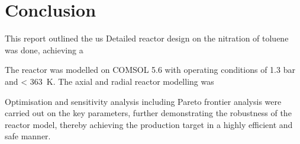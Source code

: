 \section{Conclusion} \label{sec:conclusion}
This report outlined the us
Detailed reactor design on the nitration of toluene was done, achieving a 

The reactor was modelled on COMSOL 5.6 with operating conditions of 1.3 bar and \SI{< 363}{\K}.
The axial and radial reactor modelling was 

Optimisation and sensitivity analysis including Pareto frontier analysis were carried out on the key parameters, further demonstrating the robustness of the reactor model, thereby achieving the production target in a highly efficient and safe manner. 
